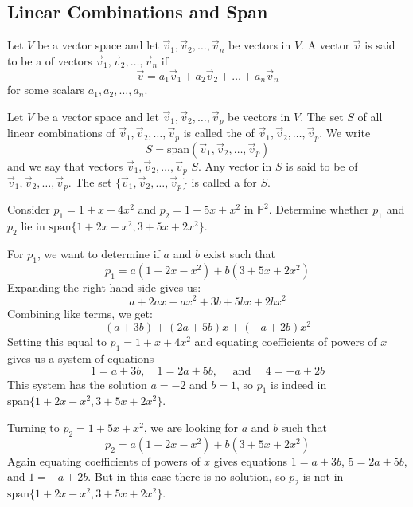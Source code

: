 \documentclass{ximera}
\begin{document}
\subsection*{Linear Combinations and Span}

\begin{definition}\label{def:lincombabstract}
Let $V$ be a vector space and let $\vec{v}_1, \vec{v}_2,\ldots ,\vec{v}_n$ be vectors in $V$.  A vector $\vec{v}$ is said to be a  of vectors $\vec{v}_1, \vec{v}_2,\ldots, \vec{v}_n$ if 
$$\vec{v}=a_1\vec{v}_1+ a_2\vec{v}_2+\ldots + a_n\vec{v}_n$$
for some scalars $a_1, a_2, \ldots ,a_n$.
\end{definition}

\begin{definition}\label{def:spanabstract} Let $V$ be a vector space and let $\vec{v}_1, \vec{v}_2,\ldots ,\vec{v}_p$ be vectors in $V$.  The set $S$ of all linear combinations of $\vec{v}_1, \vec{v}_2,\ldots ,\vec{v}_p$ is called the  of $\vec{v}_1, \vec{v}_2,\ldots ,\vec{v}_p$.  We write 
$$S=\mbox{span}(\vec{v}_1, \vec{v}_2,\ldots ,\vec{v}_p)$$
and we say that vectors $\vec{v}_1, \vec{v}_2,\ldots ,\vec{v}_p$  $S$.  Any vector in $S$ is said to be  of $\vec{v}_1, \vec{v}_2,\ldots ,\vec{v}_p$.  The set $\{\vec{v}_1, \vec{v}_2,\ldots ,\vec{v}_p\}$ is called a  for $S$.
\end{definition}
\begin{example}\label{ex:inthespanpoly}
Consider $p_{1} = 1 + x + 4x^{2}$ and $p_{2} = 1 + 5x + x^{2}$ in $\mathbb{P}^{2}$. Determine whether $p_{1}$ and $p_{2}$ lie in $\mbox{span}\{1 + 2x - x^{2}, 3 + 5x + 2x^{2}\}$.

\begin{explanation}
For $p_{1}$, we want to determine if $a$ and $b$ exist such that
\begin{equation*}
p_1 = a(1 + 2x - x^2) + b(3 + 5x + 2x^2)
\end{equation*}
Expanding the right hand side gives us:
$$a+2ax-ax^2+3b+5bx+2bx^2$$
Combining like terms, we get:
$$(a+3b)+(2a+5b)x+(-a+2b)x^2$$
Setting this equal to $p_{1} = 1 + x + 4x^{2}$ and
equating coefficients of powers of $x$ gives us a system of equations
\begin{equation*}
1 = a + 3b,\quad 1 = 2a + 5b, \quad \mbox{ and } \quad 4 = -a + 2b
\end{equation*}
This system has the solution $a = -2$ and $b = 1$, so $p_{1}$ is indeed in $\mbox{span}\{1 + 2x - x^{2}, 3 + 5x + 2x^{2}\}$.

Turning to $p_{2} = 1 + 5x + x^{2}$, we are looking for $a$ and $b$ such that 
\begin{equation*}
p_{2} = a(1 + 2x - x^{2}) + b(3 + 5x + 2x^{2})
\end{equation*}
 Again equating coefficients of powers of $x$ gives equations $1 = a + 3b$, $5 = 2a + 5b$, and $1 = -a + 2b$. But in this case there is no solution, so $p_{2}$ is not in $\mbox{span}\{1 + 2x - x^{2}, 3 + 5x + 2x^{2}\}$.
\end{explanation}
\end{example}
\end{document}
